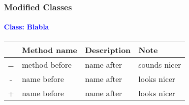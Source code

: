 \subsubsection{Modified Classes}
\paragraph*{\textcolor{Blue}{Class: Blabla}}
\paragraph*{}
\begin{longtable}{cllp{10cm}}
	\hline\rowcolor{white}{} & \textbf{Method name} & \textbf{Description} & \textbf{Note} \\ \hline
	\rowcolor{blue!10}= & method before & name after & sounds nicer \\
	\rowcolor{green!10}- & name before & name after & looks nicer \\
	\rowcolor{red!10}+ & name before & name after & looks nicer \\
	\hline
\end{longtable}
